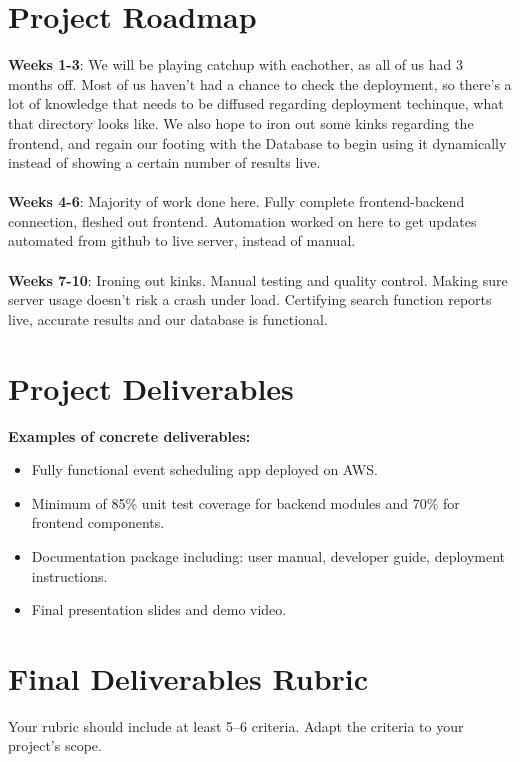 \documentclass{article}
\begin{document}
\section*{Project Roadmap}
\textbf{Weeks 1-3}: We will be playing catchup with eachother, as all of us had 3 months off. Most of us haven't had a chance to check the deployment, so there's a lot of knowledge that needs to be diffused regarding deployment techinque, what that directory looks like. We also hope to iron out some kinks regarding the frontend, and regain our footing with the Database to begin using it dynamically instead of showing a certain number of results live. 
\\\\
\textbf{Weeks 4-6}: Majority of work done here. Fully complete frontend-backend connection, fleshed out frontend. Automation worked on here to get updates automated from github to live server, instead of manual.
\\\\
\textbf{Weeks 7-10}: Ironing out kinks. Manual testing and quality control. Making sure server usage doesn't risk a crash under load. Certifying search function reports live, accurate results and our database is functional.

\section*{Project Deliverables}
\textbf{Examples of concrete deliverables:}
\begin{itemize}
    \item Fully functional event scheduling app deployed on AWS.  
    \item Minimum of 85\% unit test coverage for backend modules and 70\% for frontend components.  
    \item Documentation package including: user manual, developer guide, deployment instructions.  
    \item Final presentation slides and demo video.  
\end{itemize}



\section*{Final Deliverables Rubric}
Your rubric should include at least 5--6 criteria. Adapt the criteria to your project’s scope.  
\end{document}
